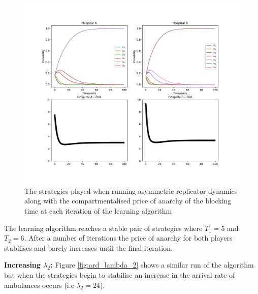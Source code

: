 \begin{figure}[H]
    \includegraphics[width=\textwidth]{imgs/asymmetric_rd_and_PoA/asymmetric_original.pdf}
    \caption{The strategies played when running asymmetric replicator dynamics
    along with the compartmentalised price of anarchy of the blocking time at
    each iteration of the learning algorithm}
    \label{fig:ard_original}
\end{figure}

The learning algorithm reaches a stable pair of 
strategies where \(T_1 = 5\) and \(T_2 = 6\). After a number of iterations the
price of anarchy for both players stabilises and barely increases until the 
final iteration. 

\textbf{Increasing \(\lambda_2\):}
Figure \ref{fig:ard_lambda_2} shows a similar run of the
algorithm but when the strategies begin to stabilise an increase in the
arrival rate of ambulances occurs (i.e \( \lambda_2 = 24 \)).


